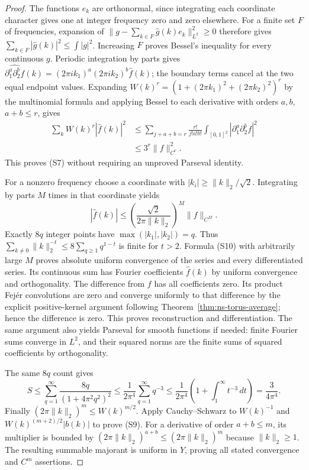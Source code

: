 \begin{proof}
The functions $e_k$ are orthonormal, since integrating each coordinate
character gives one at integer frequency zero and zero elsewhere.
For a finite set $F$ of frequencies, expansion of
$\|g-\sum_{k\in F}\widehat g(k)e_k\|_{L^2}^2\geq0$
therefore gives
$\sum_{k\in F}|\widehat g(k)|^2\leq\int|g|^2$.
Increasing $F$ proves Bessel's inequality for every continuous $g$.
Periodic integration by parts gives
$\widehat{\partial_1^a\partial_2^bf}(k)
 =(2\pi i k_1)^a(2\pi i k_2)^b\widehat f(k)$;
the boundary terms cancel at the two equal endpoint values.
Expanding $W(k)^r=(1+(2\pi k_1)^2+(2\pi k_2)^2)^r$
by the multinomial formula and applying Bessel to each derivative
with orders $a,b$, $a+b\leq r$, gives
\[
 \begin{split}
 \sum_kW(k)^r|\widehat f(k)|^2
 &\leq\sum_{j+a+b=r}\frac{r!}{j!a!b!}
                   \int_{[0,1]^2}|\partial_1^a\partial_2^bf|^2\\
 &\leq3^r\|f\|_{C^r}^2.
 \end{split}
\]
This proves (S7) without requiring an unproved Parseval identity.

For a nonzero frequency choose a coordinate with
$|k_i|\geq\|k\|_2/\sqrt2$. Integrating by parts $M$ times in
that coordinate yields
\[
 |\widehat f(k)|\leq
       \left(\frac{\sqrt2}{2\pi\|k\|_2}\right)^M\|f\|_{C^M}.
                                                               \tag{S10}
\]
Exactly $8q$ integer points have $\max(|k_1|,|k_2|)=q$.
Thus $\sum_{k\ne0}\|k\|_2^{-t}\leq8\sum_{q\geq1}q^{1-t}$
is finite for $t>2$. Formula (S10) with arbitrarily large $M$
proves absolute uniform convergence of the series and every
differentiated series. Its continuous sum has Fourier coefficients
$\widehat f(k)$ by uniform convergence and orthogonality.
The difference from $f$ has all coefficients zero. Its product
Fej\'er convolutions are zero and converge uniformly to that
difference by the explicit positive-kernel argument following
Theorem~\ref{thm:ns-torus-average}; hence the difference is zero.
This proves reconstruction and differentiation. The same argument
also yields Parseval for smooth functions if needed: finite Fourier
sums converge in $L^2$, and their squared norms are the finite sums
of squared coefficients by orthogonality.

The same $8q$ count gives
\[
 S\leq\sum_{q=1}^{\infty}\frac{8q}{(1+4\pi^2q^2)^2}
 \leq\frac1{2\pi^4}\sum_{q=1}^{\infty}q^{-3}
 \leq\frac1{2\pi^4}\left(1+\int_1^{\infty}t^{-3}\,dt\right)
 =\frac3{4\pi^4}.
\]
Finally $(2\pi\|k\|_2)^m\leq W(k)^{m/2}$.
Apply Cauchy--Schwarz to
$W(k)^{-1}$ and $W(k)^{(m+2)/2}|b(k)|$ to prove (S9).
For a derivative of order $a+b\leq m$, its multiplier is bounded
by $(2\pi\|k\|_2)^{a+b}\leq(2\pi\|k\|_2)^m$ because
$\|k\|_2\geq1$. The resulting summable majorant is uniform in
$Y$, proving all stated convergence and $C^m$ assertions.
\end{proof}

